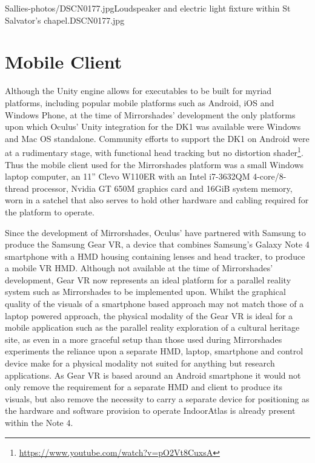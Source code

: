        {Sallies-photos/DSCN0177.jpg}{Loudspeaker and electric light fixture within St Salvator's chapel.}{DSCN0177.jpg}
       

\section{Mobile Client}
\label{mobile-client}
Although the Unity engine allows for executables to be built for myriad platforms, including popular mobile platforms such as Android, iOS and Windows Phone, at the time of Mirrorshades' development the only platforms upon which Oculus' Unity integration for the DK1 was available were Windows and Mac OS standalone. Community efforts to support the DK1 on Android were at a rudimentary stage, with functional head tracking but no distortion shader\footnote{\url{https://www.youtube.com/watch?v=pO2Vt8CuxsA}}. Thus the mobile client used for the Mirrorshades platform was a small Windows laptop computer, an 11'' Clevo W110ER with an Intel i7-3632QM 4-core/8-thread processor, Nvidia GT 650M graphics card and 16GiB system memory, worn in a satchel that also serves to hold other hardware and cabling required for the platform to operate.

Since the development of Mirrorshades, Oculus' have partnered with Samsung to produce the Samsung Gear VR, a device that combines Samsung's Galaxy Note 4 smartphone with a HMD housing containing lenses and head tracker, to produce a mobile VR HMD. Although not available at the time of Mirrorshades' development, Gear VR now represents an ideal platform for a parallel reality system such as Mirrorshades to be implemented upon. Whilst the graphical quality of the visuals of a smartphone based approach may not match those of a laptop powered approach, the physical modality of the Gear VR is ideal for a mobile application such as the parallel reality exploration of a cultural heritage site, as even in a more graceful setup than those used during Mirrorshades experiments the reliance upon a separate HMD, laptop, smartphone and control device make for a physical modality not suited for anything but research applications. As Gear VR is based around an Android smartphone it would not only remove the requirement for a separate HMD and client to produce its visuals, but also remove the necessity to carry a separate device for positioning as the hardware and software provision to operate IndoorAtlas is already present within the Note 4.


